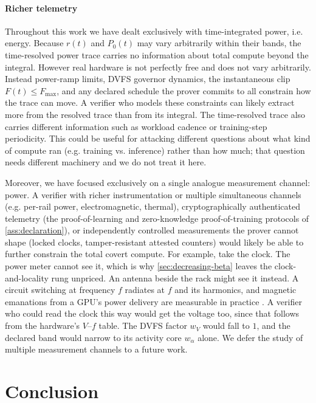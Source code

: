 \documentclass{article}
\theoremstyle{plain}
\theoremstyle{definition}
\theoremstyle{remark}
\begin{document}
\paragraph{Richer telemetry}
Throughout this work we have dealt exclusively with time-integrated power, i.e. energy. Because $r(t)$ and $P_0(t)$ may vary arbitrarily within their
bands, the time-resolved power trace carries no information about total compute beyond the integral. However real hardware is not perfectly free and does not vary arbitrarily. Instead power-ramp limits, DVFS
governor dynamics, the instantaneous clip $F(t) \le F_{\max}$, and any
declared schedule the prover commits to all constrain how the trace
can move. A verifier who models these constraints can likely extract more from the
resolved trace than from its integral. The time-resolved trace also carries different information such as workload cadence or 
training-step periodicity. This could be useful for attacking different questions about what kind of compute
ran (e.g. training vs. inference) rather than how much; that question needs different machinery and we
do not treat it here.

Moreover, we have focused exclusively on a single analogue measurement channel: power. A verifier with richer
instrumentation or multiple simultaneous channels
(e.g. per-rail power, electromagnetic, thermal), cryptographically
authenticated telemetry (the proof-of-learning and zero-knowledge
proof-of-training protocols of \cref{ass:declaration}), or independently
controlled measurements the prover cannot shape (locked clocks,
tamper-resistant attested counters) would likely be able to further constrain the total covert compute. For example, take the clock. The power meter cannot see it, which is why
\cref{sec:decreasing-beta} leaves the clock-and-locality rung unpriced. An
antenna beside the rack might see it instead. A circuit switching at frequency
$f$ radiates at $f$ and its harmonics, and magnetic emanations from a GPU's
power delivery are measurable in practice \citep{maia2022magnetic}. A verifier
who could read the clock this way would get the voltage too, since that follows
from the hardware's $V$--$f$ table. The DVFS factor $w_V$ would fall to $1$, and
the declared band would narrow to its activity core $w_\alpha$ alone. We defer the study of multiple measurement channels to a future work. 



\section{Conclusion}
\label{sec:conclusion}
\end{document}
